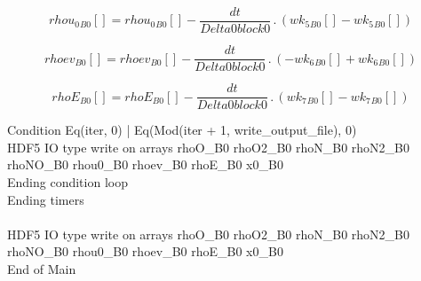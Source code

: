 \documentclass{article}
\begin{document}
\begin{dmath}{rhou_{0}{_{B0}}}[{}] = {rhou_{0}{_{B0}}}[{}] - \frac{dt}{Delta0block0} \,.\, \left({wk_{5}{_{B0}}}[{}] - {wk_{5}{_{B0}}}[{}]\right)\end{dmath}

\begin{dmath}{rhoev{_{B0}}}[{}] = {rhoev{_{B0}}}[{}] - \frac{dt}{Delta0block0} \,.\, \left(- {wk_{6}{_{B0}}}[{}] + {wk_{6}{_{B0}}}[{}]\right)\end{dmath}

\begin{dmath}{rhoE{_{B0}}}[{}] = {rhoE{_{B0}}}[{}] - \frac{dt}{Delta0block0} \,.\, \left({wk_{7}{_{B0}}}[{}] - {wk_{7}{_{B0}}}[{}]\right)\end{dmath}

\noindent Condition Eq(iter, 0) | Eq(Mod(iter + 1, write_output_file), 0)\\\noindent HDF5 IO type write on arrays rhoO_B0 rhoO2_B0 rhoN_B0 rhoN2_B0 rhoNO_B0 rhou0_B0 rhoev_B0 rhoE_B0 x0_B0\\\noindent Ending condition loop %
\\\noindent Ending timers\\
\\\noindent HDF5 IO type write on arrays rhoO_B0 rhoO2_B0 rhoN_B0 rhoN2_B0 rhoNO_B0 rhou0_B0 rhoev_B0 rhoE_B0 x0_B0\\\noindent End of Main\\
\end{document}
